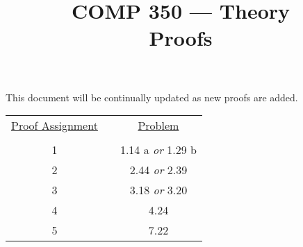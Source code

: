 \documentclass[nobib]{tufte-handout}
\title{COMP 350 --- Theory \\ Proofs}
\begin{document}
\maketitle

This document will be continually updated as new proofs are added.

\begin{center}
\begin{tabular}{ccc}
  \underline{Proof Assignment} & \hspace{.5in} &  \underline{Problem} \\ \\
  1 & & 1.14 a \textit{or} 1.29 b \\
  2 & & 2.44 \textit{or} 2.39 \\
  3 & & 3.18 \textit{or} 3.20 \\
  4 & & 4.24 \\
  5 & & 7.22 \\ 
\end{tabular}
\end{center}
\end{document}
